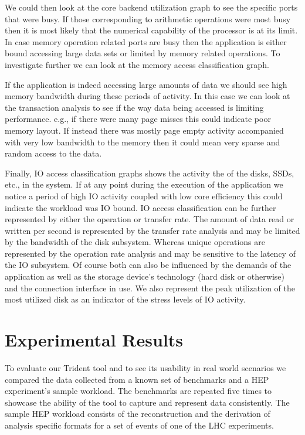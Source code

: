 \documentclass{webofc}
\begin{document}
We could then look at the core backend utilization graph to see the specific ports that were busy. If those corresponding to arithmetic operations were most busy then it is most likely that the numerical capability of the processor is at its limit. In case memory operation related ports are busy then the application is either bound accessing large data sets or limited by memory related operations. To investigate further we can look at the memory access classification graph.

If the application is indeed accessing large amounts of data we should see high memory bandwidth during these periods of activity. In this case we can look at the transaction analysis to see if the way data being accessed is limiting performance. e.g., if there were many page misses this could indicate poor memory layout. If instead there was mostly page empty activity accompanied with very low bandwidth to the memory then it could mean very sparse and random access to the data. 

Finally, IO access classification graphs shows the activity the of the disks, SSDs, etc., in the system. If at any point during the execution of the application we notice a period of high IO activity coupled with low core efficiency this could indicate the workload was IO bound. IO access classification can be further represented by either the operation or transfer rate. The amount of data read or written per second is represented by the transfer rate analysis and may be limited by the bandwidth of the disk subsystem. Whereas unique operations are represented by the operation rate analysis and may be sensitive to the latency of the IO subsystem. Of course both can also be influenced by the demands of the application as well as the storage device's technology (hard disk or otherwise) and the connection interface in use. We also represent the peak utilization of the most utilized disk as an indicator of the stress levels of IO activity.

\section{Experimental Results}
\label{sec:results}

To evaluate our Trident tool and to see its usability in real world scenarios we compared the data collected from a known set of benchmarks and a HEP experiment's sample workload. The benchmarks are repeated five times to showcase the ability of the tool to capture and represent data consistently. The sample HEP workload consists of the reconstruction and the derivation of analysis specific formats for a set of events of one of the LHC experiments.
\end{document}
